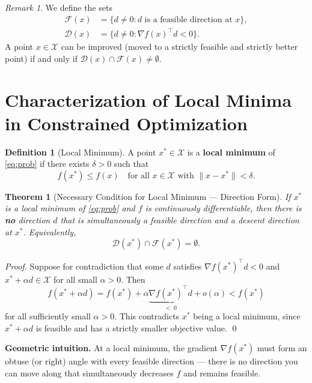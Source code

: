 \documentclass[11pt]{article}
\theoremstyle{definition}
\newtheorem{definition}{Definition}
\theoremstyle{plain}
\newtheorem{theorem}{Theorem}
\theoremstyle{remark}
\newtheorem{remark}{Remark}
\begin{document}
\begin{remark}
  We define the sets
  \begin{align*}
    \mathcal{F}(x) &= \{d \neq 0 : d \text{ is a feasible direction at } x\}, \\
    \mathcal{D}(x) &= \{d \neq 0 : \nabla f(x)^\top d < 0\}.
  \end{align*}
  A point $x \in \mathcal{X}$ can be improved (moved to a strictly feasible and strictly better point) if and only if $\mathcal{D}(x) \cap \mathcal{F}(x) \neq \emptyset$.
\end{remark}

\section{Characterization of Local Minima in Constrained Optimization}

\begin{definition}[Local Minimum]
  A point $x^* \in \mathcal{X}$ is a \textbf{local minimum} of \eqref{eq:prob} if there exists $\delta > 0$ such that
  \[
    f(x^*) \leq f(x) \quad \text{for all } x \in \mathcal{X} \text{ with } \|x - x^*\| < \delta.
  \]
\end{definition}

\begin{theorem}[Necessary Condition for Local Minimum — Direction Form]
  \label{thm:local_min_dir}
  If $x^*$ is a local minimum of \eqref{eq:prob} and $f$ is continuously differentiable, then there is \textbf{no} direction $d$ that is simultaneously a feasible direction and a descent direction at $x^*$. Equivalently,
  \[
    \mathcal{D}(x^*) \cap \mathcal{F}(x^*) = \emptyset.
  \]
\end{theorem}

\begin{proof}
  Suppose for contradiction that some $d$ satisfies $\nabla f(x^*)^\top d < 0$ and $x^* + \alpha d \in \mathcal{X}$ for all small $\alpha > 0$. Then
  \[
    f(x^* + \alpha d) = f(x^*) + \alpha \underbrace{\nabla f(x^*)^\top d}_{<\;0} + o(\alpha) < f(x^*)
  \]
  for all sufficiently small $\alpha > 0$. This contradicts $x^*$ being a local minimum, since $x^* + \alpha d$ is feasible and has a strictly smaller objective value. \qed
\end{proof}

\textbf{Geometric intuition.} At a local minimum, the gradient $\nabla f(x^*)$ must form an obtuse (or right) angle with every feasible direction — there is no direction you can move along that simultaneously decreases $f$ and remains feasible.
\end{document}
